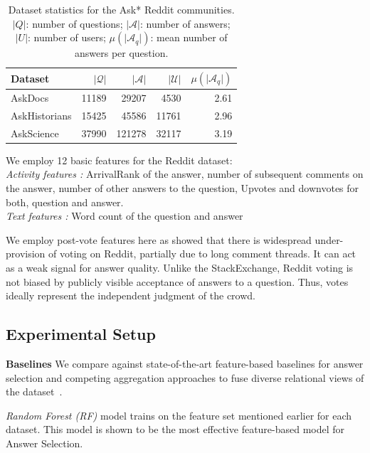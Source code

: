 \begin{table}[h]
\centering
\begin{tabular}{l  r r r r}
 \toprule
 Dataset & $\vert \mathcal{Q} \vert$ & $\vert \mathcal{A} \vert$ & $\vert \mathcal{U} \vert$ & $ \mu (\vert  \mathcal{A}_q \vert) $ \\  \midrule
 AskDocs & 11189 & 29207& 4530 & 2.61               \\
 AskHistorians & 15425 & 45586 & 11761 & 2.96                     \\
 AskScience & 37990 & 121278 & 32117 & 3.19                 \\
  \bottomrule
\end{tabular}
  \caption{Dataset statistics for the Ask* Reddit communities. $\vert Q \vert$: number of questions; $\vert  \mathcal{A} \vert$: number of answers; $ \vert U \vert $: number of users; $ \mu (\vert  \mathcal{A}_q \vert) $: mean number of answers per question.}
\end{table}

We employ 12 basic features for the Reddit dataset: \\
\emph{Activity features :} ArrivalRank of the answer, number of subsequent comments on the answer, number of other answers to the question, Upvotes and downvotes for both, question and answer.\\
\emph{Text features :} Word count of the question and answer

We employ post-vote features here as \cite{Gilbert:2013} showed that there is widespread under-provision of voting on Reddit, partially due to long comment threads. It can act as a weak signal for answer quality. Unlike the StackExchange, Reddit voting is not biased by publicly visible acceptance of answers to a question. Thus, votes ideally represent the independent judgment of the crowd.


\subsection{Experimental Setup}

\noindent
\textbf{Baselines} We compare against state-of-the-art feature-based baselines for answer selection and competing aggregation approaches to fuse diverse relational views of the dataset~\cite{DualGCN, relationalGCN}.

\noindent
\textit{Random Forest (RF)} \cite{BurelMA16, TianZL13} model trains on the feature set mentioned earlier for each dataset. This model is shown to be the most effective feature-based model for Answer Selection.

